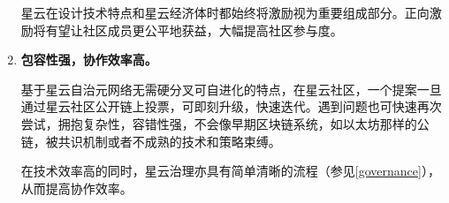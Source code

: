 \begin{enumerate}
	星云在设计技术特点和星云经济体时都始终将激励视为重要组成部分。正向激励将有望让社区成员更公平地获益，大幅提高社区参与度。
	
	\item 

	\textbf{包容性强，协作效率高。}
	
	基于星云自治元网络无需硬分叉可自进化的特点，在星云社区，一个提案一旦通过星云社区公开链上投票，可即刻升级，快速迭代。遇到问题也可快速再次尝试，拥抱复杂性，容错性强，不会像早期区块链系统，如以太坊那样的公链，被共识机制或者不成熟的技术和策略束缚。

	在技术效率高的同时，星云治理亦具有简单清晰的流程（参见\ref{governance}），从而提高协作效率。

\end{enumerate}
